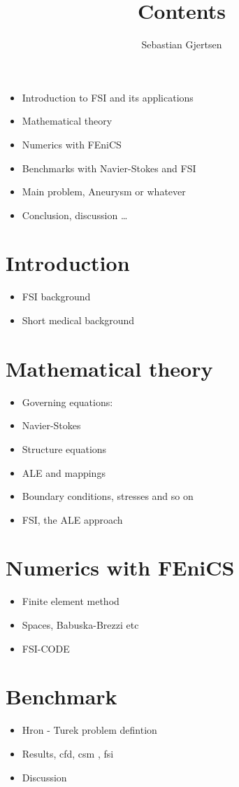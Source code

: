 
\usepackage{listings}
\usepackage{amsmath}
\title{Contents}
\author{Sebastian Gjertsen}

\maketitle

\begin{itemize}  
\item Introduction to FSI and its applications
\item Mathematical theory 
\item Numerics with FEniCS
\item Benchmarks with Navier-Stokes and FSI
\item Main problem, Aneurysm or whatever
\item Conclusion, discussion \ldots 
\end{itemize}

\section{Introduction}
\begin{itemize}
\item FSI background 
\item Short medical background
\end{itemize}

\section{Mathematical theory}
\begin{itemize}
\item Governing equations:
\item Navier-Stokes
\item Structure equations
\item ALE and mappings
\item Boundary conditions, stresses and so on
\item FSI, the ALE approach
\end{itemize}

\section{Numerics with FEniCS}
\begin{itemize}
\item Finite element method
\item Spaces, Babuska-Brezzi etc
\item FSI-CODE
\end{itemize}

\section{Benchmark}
\begin{itemize}
\item Hron - Turek problem defintion
\item Results, cfd, csm , fsi
\item Discussion 
\end{itemize}

